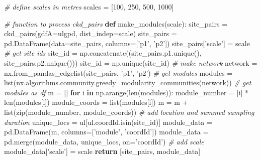 \documentclass[]{article}
\newenvironment{Shaded}{}{}
\newcommand{\BuiltInTok}[1]{#1}
\newcommand{\CommentTok}[1]{\textcolor[rgb]{0.38,0.63,0.69}{\textit{#1}}}
\newcommand{\ControlFlowTok}[1]{\textcolor[rgb]{0.00,0.44,0.13}{\textbf{#1}}}
\newcommand{\DecValTok}[1]{\textcolor[rgb]{0.25,0.63,0.44}{#1}}
\newcommand{\KeywordTok}[1]{\textcolor[rgb]{0.00,0.44,0.13}{\textbf{#1}}}
\newcommand{\NormalTok}[1]{#1}
\newcommand{\OperatorTok}[1]{\textcolor[rgb]{0.40,0.40,0.40}{#1}}
\newcommand{\StringTok}[1]{\textcolor[rgb]{0.25,0.44,0.63}{#1}}
\begin{document}
\begin{Shaded}
\begin{Highlighting}[]
\CommentTok{# define scales in metres}
\NormalTok{scales }\OperatorTok{=}\NormalTok{ [}\DecValTok{100}\NormalTok{, }\DecValTok{250}\NormalTok{, }\DecValTok{500}\NormalTok{, }\DecValTok{1000}\NormalTok{]}


\CommentTok{# function to process ckd_pairs}
\KeywordTok{def}\NormalTok{ make_modules(scale):}
\NormalTok{    site_pairs }\OperatorTok{=}\NormalTok{ ckd_pairs(gdfA}\OperatorTok{=}\NormalTok{ulgpd, dist_indep}\OperatorTok{=}\NormalTok{scale)}
\NormalTok{    site_pairs }\OperatorTok{=}\NormalTok{ pd.DataFrame(data}\OperatorTok{=}\NormalTok{site_pairs, columns}\OperatorTok{=}\NormalTok{[}\StringTok{'p1'}\NormalTok{, }\StringTok{'p2'}\NormalTok{])}
\NormalTok{    site_pairs[}\StringTok{'scale'}\NormalTok{] }\OperatorTok{=}\NormalTok{ scale}
    \CommentTok{# get site ids}
\NormalTok{    site_id }\OperatorTok{=}\NormalTok{ np.concatenate((site_pairs.p1.unique(), site_pairs.p2.unique()))}
\NormalTok{    site_id }\OperatorTok{=}\NormalTok{ np.unique(site_id)}
    \CommentTok{# make network}
\NormalTok{    network }\OperatorTok{=}\NormalTok{ nx.from_pandas_edgelist(site_pairs, }\StringTok{'p1'}\NormalTok{, }\StringTok{'p2'}\NormalTok{)}
    \CommentTok{# get modules}
\NormalTok{    modules }\OperatorTok{=} \BuiltInTok{list}\NormalTok{(nx.algorithms.community.greedy_modularity_communities(network))}
    \CommentTok{# get modules as df}
\NormalTok{    m }\OperatorTok{=}\NormalTok{ []}
    \ControlFlowTok{for}\NormalTok{ i }\KeywordTok{in}\NormalTok{ np.arange(}\BuiltInTok{len}\NormalTok{(modules)):}
\NormalTok{        module_number }\OperatorTok{=}\NormalTok{ [i] }\OperatorTok{*} \BuiltInTok{len}\NormalTok{(modules[i])}
\NormalTok{        module_coords }\OperatorTok{=} \BuiltInTok{list}\NormalTok{(modules[i])}
\NormalTok{        m }\OperatorTok{=}\NormalTok{ m }\OperatorTok{+} \BuiltInTok{list}\NormalTok{(}\BuiltInTok{zip}\NormalTok{(module_number, module_coords))}
    \CommentTok{# add location and summed sampling duration}
\NormalTok{    unique_locs }\OperatorTok{=}\NormalTok{ ul[ul.coordId.isin(site_id)]}
\NormalTok{    module_data }\OperatorTok{=}\NormalTok{ pd.DataFrame(m, columns}\OperatorTok{=}\NormalTok{[}\StringTok{'module'}\NormalTok{, }\StringTok{'coordId'}\NormalTok{])}
\NormalTok{    module_data }\OperatorTok{=}\NormalTok{ pd.merge(module_data, unique_locs, on}\OperatorTok{=}\StringTok{'coordId'}\NormalTok{)}
    \CommentTok{# add scale}
\NormalTok{    module_data[}\StringTok{'scale'}\NormalTok{] }\OperatorTok{=}\NormalTok{ scale}
    \ControlFlowTok{return}\NormalTok{ [site_pairs, module_data]}



\end{Highlighting}
\end{Shaded}
\end{document}
